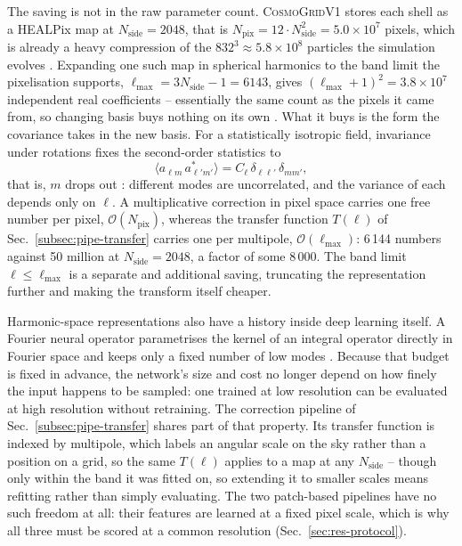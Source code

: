 \documentclass{report}
\begin{document}
The saving is not in the raw parameter count. \textsc{CosmoGridV1} stores each shell as a HEALPix map at \mbox{$N_{\mathrm{side}}=2048$}, that is \mbox{$N_{\mathrm{pix}}=$\mbox{$12\cdot N_{\mathrm{side}}^2$}$= 5.0\times10^{7}$} pixels, which is already a heavy compression of the \mbox{$832^3 \approx 5.8\times10^{8}$} particles the simulation evolves \cite{gorski_healpix_2005}. Expanding one such map in spherical harmonics to the band limit the pixelisation supports, \mbox{$\ell_{\max} = 3N_{\mathrm{side}}-1 = 6143$}, gives \mbox{$(\ell_{\max}+1)^2 = 3.8\times10^{7}$} independent real coefficients -- essentially the same count as the pixels it came from, so changing basis buys nothing on its own \cite{sullivan_methods_2024}. What it buys is the form the covariance takes in the new basis. For a statistically isotropic field, invariance under rotations fixes the second-order statistics to
\begin{equation}
  \big\langle a_{\ell m}\, a^{*}_{\ell' m'} \big\rangle = C_\ell\, \delta_{\ell \ell'}\, \delta_{m m'},
  \label{eq:alm_cov}
\end{equation}
that is, \mbox{$m$} drops out \cite{challinor_lecture_2009}: different modes are uncorrelated, and the variance of each depends only on \mbox{$\ell$}. A multiplicative correction in pixel space carries one free number per pixel, \mbox{$\mathcal{O}(N_{\mathrm{pix}})$}, whereas the transfer function \mbox{$T(\ell)$} of Sec.~\ref{subsec:pipe-transfer} carries one per multipole, \mbox{$\mathcal{O}(\ell_{\max})$}: 6\,144 numbers against 50 million at \mbox{$N_{\mathrm{side}}=2048$}, a factor of some 8\,000. The band limit \mbox{$\ell \le \ell_{\max}$} is a separate and additional saving, truncating the representation further and making the transform itself cheaper.

Harmonic-space representations also have a history inside deep learning itself. A Fourier neural operator parametrises the kernel of an integral operator directly in Fourier space and keeps only a fixed number of low modes \cite{li_fourier_2021}. Because that budget is fixed in advance, the network's size and cost no longer depend on how finely the input happens to be sampled: one trained at low resolution can be evaluated at high resolution without retraining. The correction pipeline of Sec.~\ref{subsec:pipe-transfer} shares part of that property. Its transfer function is indexed by multipole, which labels an angular scale on the sky rather than a position on a grid, so the same \mbox{$T(\ell)$} applies to a map at any \mbox{$N_{\mathrm{side}}$} -- though only within the band it was fitted on, so extending it to smaller scales means refitting rather than simply evaluating. The two patch-based pipelines have no such freedom at all: their features are learned at a fixed pixel scale, which is why all three must be scored at a common resolution (Sec.~\ref{sec:res-protocol}).
\end{document}
